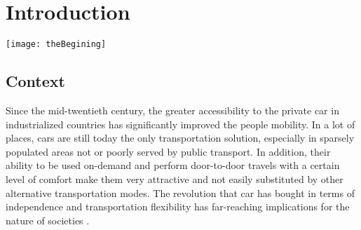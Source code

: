 \chapter{Introduction} \label{chap:introduction}
\begin{bibunit}[ieeetr]
\minitoc
\vspace{2cm}
%
\noindent
\begin{minipage}[c]{0.45\textwidth}
\texttt{[image: theBegining]}
\end{minipage}
\hfill
\begin{minipage}[c]{0.45\textwidth}
\begin{abstract}
\end{abstract}
\end{minipage}

\newpage
\section{Context}
Since the mid-twentieth century, the greater accessibility to the private car in industrialized countries has significantly improved the people mobility.
In a lot of places, cars are still today the only transportation solution, especially in sparsely populated areas not or poorly served by public transport.
In addition, their ability to be used on-demand and perform door-to-door travels with a certain level of comfort make them very attractive and not easily substituted by other alternative transportation modes.
The revolution that car has bought in terms of independence and transportation flexibility has far-reaching implications for the nature of societies \cite{jakle_lots_2004}.


\end{bibunit}
